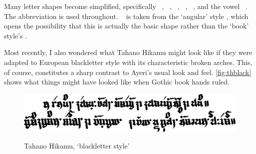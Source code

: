 Many letter shapes become simplified, specifically ~, 
~, ~, ~, ~, and 
the vowel ~. The abbreviation  is used 
throughout. ~ is taken from the `angular' style , which opens the possibility that this is actually the basic shape rather 
than the `book' style's .

Most recently, I also wondered what Tahano Hikamu might look like if they were 
adapted to European blackletter style with its characteristic broken arches. 
This, of course, constitutes a sharp contrast to Ayeri's usual look and feel.
\autoref{fig:thblack} shows what things might have looked like when Gothic book 
hands ruled.

\begin{figure}[ht]\centering
\caption{Tahano Hikamu, `blackletter style'}
\includegraphics[width=0.75\linewidth]{images/tahanoblack-300dpi-bw.png}
\label{fig:thblack}
\end{figure}

